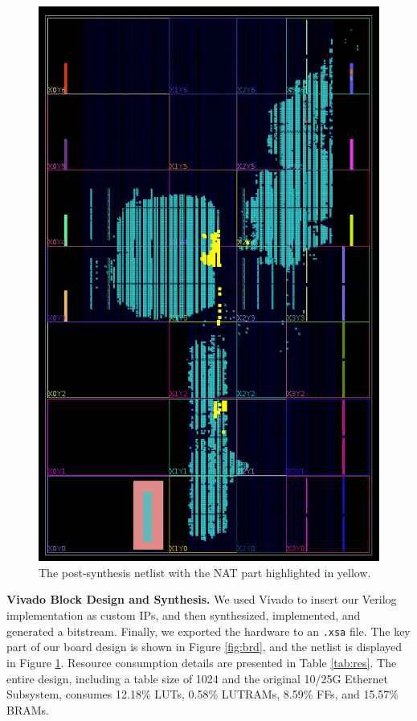 \begin{figure}[t]
    \centering
    \includegraphics[width=\linewidth]{images/brdimpl.png}
    \caption{The post-synthesis netlist with the NAT part highlighted in yellow.}
    \label{fig:brdimpl}
\end{figure}

\textbf{Vivado Block Design and Synthesis.} We used Vivado to insert our Verilog implementation as custom IPs, and then synthesized, implemented, and generated a bitstream. Finally, we exported the hardware to an \verb|.xsa| file. The key part of our board design is shown in Figure \ref{fig:brd}, and the netlist is displayed in Figure \ref{fig:brdimpl}. Resource consumption details are presented in Table \ref{tab:res}. The entire design, including a table size of 1024 and the original 10/25G Ethernet Subsystem, consumes 12.18\% LUTs, 0.58\% LUTRAMs, 8.59\% FFs, and 15.57\% BRAMs.


